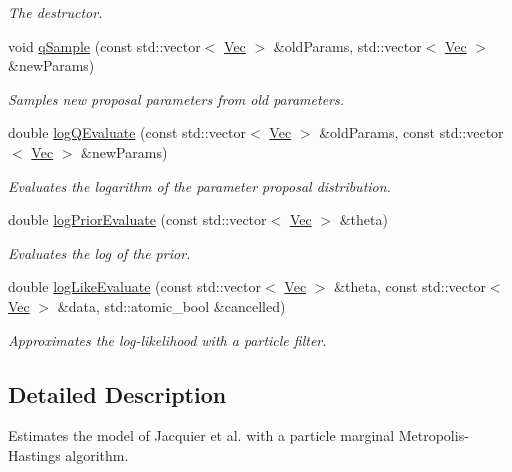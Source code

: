 \begin{DoxyCompactItemize}
\begin{DoxyCompactList}\small\item\em The destructor. \end{DoxyCompactList}\item 
void \hyperlink{classPmmh__jac__apf_a0127e07b0f9ba6b042418c575b78ca55}{q\+Sample} (const std\+::vector$<$ \hyperlink{pmfs_8h_a4c7df05c6f5e8a0d15ae14bcdbc07152}{Vec} $>$ \&old\+Params, std\+::vector$<$ \hyperlink{pmfs_8h_a4c7df05c6f5e8a0d15ae14bcdbc07152}{Vec} $>$ \&new\+Params)
\begin{DoxyCompactList}\small\item\em Samples new proposal parameters from old parameters. \end{DoxyCompactList}\item 
double \hyperlink{classPmmh__jac__apf_a17edc1dc687fb753eff22d5bb7e44964}{log\+Q\+Evaluate} (const std\+::vector$<$ \hyperlink{pmfs_8h_a4c7df05c6f5e8a0d15ae14bcdbc07152}{Vec} $>$ \&old\+Params, const std\+::vector$<$ \hyperlink{pmfs_8h_a4c7df05c6f5e8a0d15ae14bcdbc07152}{Vec} $>$ \&new\+Params)
\begin{DoxyCompactList}\small\item\em Evaluates the logarithm of the parameter proposal distribution. \end{DoxyCompactList}\item 
double \hyperlink{classPmmh__jac__apf_ab253d4b6c59a5e9529d042eb7b98dc8a}{log\+Prior\+Evaluate} (const std\+::vector$<$ \hyperlink{pmfs_8h_a4c7df05c6f5e8a0d15ae14bcdbc07152}{Vec} $>$ \&theta)
\begin{DoxyCompactList}\small\item\em Evaluates the log of the prior. \end{DoxyCompactList}\item 
double \hyperlink{classPmmh__jac__apf_acd0869e2b01566fcd45d85e850d4ee11}{log\+Like\+Evaluate} (const std\+::vector$<$ \hyperlink{pmfs_8h_a4c7df05c6f5e8a0d15ae14bcdbc07152}{Vec} $>$ \&theta, const std\+::vector$<$ \hyperlink{pmfs_8h_a4c7df05c6f5e8a0d15ae14bcdbc07152}{Vec} $>$ \&data, std\+::atomic\+\_\+bool \&cancelled)
\begin{DoxyCompactList}\small\item\em Approximates the log-\/likelihood with a particle filter. \end{DoxyCompactList}\end{DoxyCompactItemize}


\subsection{Detailed Description}
Estimates the model of Jacquier et al. with a particle marginal Metropolis-\/\+Hastings algorithm. 

